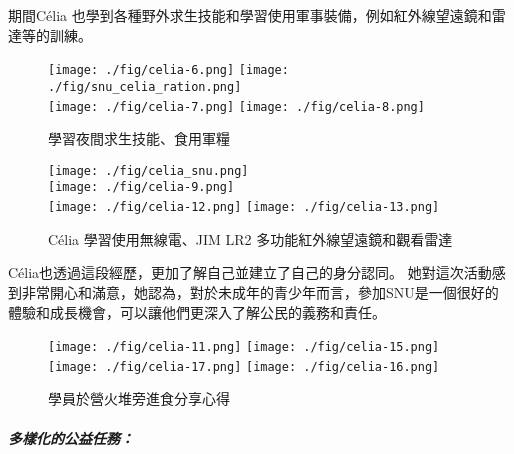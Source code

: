 \documentclass[a4paper,14pt]{extarticle}
\theoremstyle{plain}
\theoremstyle{remark}
\numberwithin{equation}{section}
\begin{document}
期間Célia 也學到各種野外求生技能和學習使用軍事裝備，例如紅外線望遠鏡和雷達等的訓練。

\begin{figure}[H]
  \centering
  \texttt{[image: ./fig/celia-6.png]}
  \texttt{[image: ./fig/snu\_celia\_ration.png]}
  \\ \vspace{0.1cm}
  \texttt{[image: ./fig/celia-7.png]}
  \texttt{[image: ./fig/celia-8.png]}
  \caption{學習夜間求生技能、食用軍糧}
  \label{fig:life_skill}
\end{figure}

\begin{figure}[H]
  \centering
  \texttt{[image: ./fig/celia\_snu.png]}
  \\ \vspace{0.1cm}
  \texttt{[image: ./fig/celia-9.png]}
  \\ \vspace{0.1cm}
    \texttt{[image: ./fig/celia-12.png]}
  \texttt{[image: ./fig/celia-13.png]}
  \caption{Célia 學習使用無線電、JIM LR2 多功能紅外線望遠鏡和觀看雷達}
\end{figure}


Célia也透過這段經歷，更加了解自己並建立了自己的身分認同。
她對這次活動感到非常開心和滿意，她認為，對於未成年的青少年而言，參加SNU是一個很好的體驗和成長機會，可以讓他們更深入了解公民的義務和責任。

\begin{figure}[H]
    \centering
    \texttt{[image: ./fig/celia-11.png]}
    \texttt{[image: ./fig/celia-15.png]}
  \\ \vspace{0.1cm}
    \texttt{[image: ./fig/celia-17.png]}
    \texttt{[image: ./fig/celia-16.png]}
		\caption{學員於營火堆旁進食分享心得}
\end{figure}

\subparagraph{多樣化的公益任務：}
\end{document}
